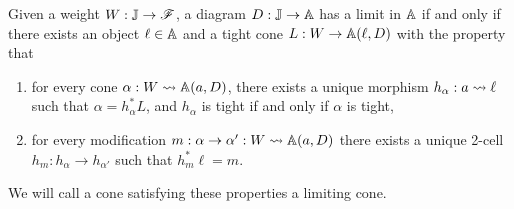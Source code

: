 \documentclass[../thesis.tex]{subfiles}
\begin{document}
  \begin{proposition}\label{prop:chr of limits}
    Given a weight $W : {\mathbb{J}} \to {\mathscr{F}}$, a diagram $D : {\mathbb{J}} \to {\mathbb{A}}$ has a limit in ${\mathbb{A}}$ if and only if there
    exists an object $\ell \in {\mathbb{A}}$ and a tight cone $L : W \to {\mathbb{A}}(\ell,D)$ with the property that
    \begin{enumerate}
      \item for every cone $\alpha : W \rightsquigarrow {\mathbb{A}}(a,D)$, there exists a unique morphism $h_\alpha : a \rightsquigarrow
        \ell$ such that $\alpha = h_\alpha^*L$, and $h_\alpha$ is tight if and only if $\alpha$ is tight,
      \item for every modification $m : \alpha \to \alpha' : W \rightsquigarrow {\mathbb{A}}(a,D)$ there exists a unique 2-cell
        $h_m : h_\alpha \to h_{\alpha'}$ such that $h_m^*\ell = m$.
    \end{enumerate}
    We will call a cone satisfying these properties a limiting cone.
  \end{proposition}
\end{document}
